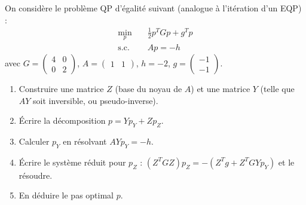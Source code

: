 \bigskip
\begin{exercice}
On considère le problème QP d'égalité suivant (analogue à l'itération d'un EQP) :
\begin{align*}
    \min_{p} \quad & \frac{1}{2} p^T G p + g^T p \\
    \text{s.c. } \quad & A p = -h
\end{align*}
avec $G = \begin{pmatrix} 4 & 0 \\ 0 & 2 \end{pmatrix}$, $A = \begin{pmatrix} 1 & 1 \end{pmatrix}$, $h = -2$, $g = \begin{pmatrix} -1 \\ -1 \end{pmatrix}$.
\begin{enumerate}
    \item Construire une matrice $Z$ (base du noyau de $A$) et une matrice $Y$ (telle que $AY$ soit inversible, ou pseudo-inverse).
    \item Écrire la décomposition $p = Y p_Y + Z p_Z$.
    \item Calculer $p_Y$ en résolvant $AY p_Y = -h$.
    \item Écrire le système réduit pour $p_Z$ : $(Z^T G Z) p_Z = -(Z^T g + Z^T G Y p_Y)$ et le résoudre.
    \item En déduire le pas optimal $p$.
\end{enumerate}
\end{exercice}

